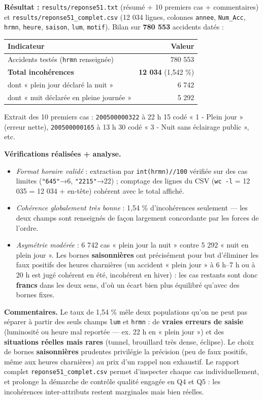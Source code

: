 \documentclass[11pt,a4paper]{article}
\newcommand{\rub}[2]{\textbf{\textcolor{#1}{#2}}}
\begin{document}
\rub{labresultat}{Résultat :} \texttt{results/reponse51.txt} (résumé + 10 premiers cas + commentaires) et \texttt{results/reponse51\_complet.csv} (12 034 lignes, colonnes \texttt{annee}, \texttt{Num\_Acc}, \texttt{hrmn}, \texttt{heure}, \texttt{saison}, \texttt{lum}, \texttt{motif}). Bilan sur \textbf{780 553} accidents datés :

\begin{center}
\begin{tabular}{l r}
\hline
\textbf{Indicateur} & \textbf{Valeur} \\
\hline
Accidents testés (\texttt{hrmn} renseignée) & 780 553 \\
\textbf{Total incohérences} & \textbf{12 034} (1,542 \%) \\
dont « plein jour déclaré la nuit » & 6 742 \\
dont « nuit déclarée en pleine journée » & 5 292 \\
\hline
\end{tabular}
\end{center}

Extrait des 10 premiers cas : \texttt{200500000322} à 22 h 15 codé « 1 - Plein jour » (erreur nette), \texttt{200500000165} à 13 h 30 codé « 3 - Nuit sans éclairage public », etc.

\rub{labanalyse}{Vérifications réalisées + analyse.}

\begin{itemize}
\item \emph{Format horaire validé} : extraction par \texttt{int(hrmn)//100} vérifiée sur des cas limites (\texttt{"645"}→6, \texttt{"2215"}→22) ; comptage des lignes du CSV (\texttt{wc -l} = 12 035 = 12 034 + en-tête) cohérent avec le total affiché.
\item \emph{Cohérence globalement très bonne} : 1,54 \% d'incohérences seulement — les deux champs sont renseignés de façon largement concordante par les forces de l'ordre.
\item \emph{Asymétrie modérée} : 6 742 cas « plein jour la nuit » contre 5 292 « nuit en plein jour ». Les bornes \textbf{saisonnières} ont précisément pour but d'éliminer les faux positifs des heures charnières (un accident « plein jour » à 6 h–7 h ou à 20 h est jugé cohérent en été, incohérent en hiver) : les cas restants sont donc \textbf{francs} dans les deux sens, d'où un écart bien plus équilibré qu'avec des bornes fixes.
\end{itemize}

\rub{labcomment}{Commentaires.} Le taux de 1,54 \% mêle deux populations qu'on ne peut pas séparer à partir des seuls champs \texttt{lum} et \texttt{hrmn} : de \textbf{vraies erreurs de saisie} (luminosité ou heure mal reportée — ex. 22 h en « plein jour ») et des \textbf{situations réelles mais rares} (tunnel, brouillard très dense, éclipse). Le choix de bornes \textbf{saisonnières} prudentes privilégie la précision (peu de faux positifs, même aux heures charnières) au prix d'un rappel non exhaustif. Le rapport complet \texttt{reponse51\_complet.csv} permet d'inspecter chaque cas individuellement, et prolonge la démarche de contrôle qualité engagée en Q4 et Q5 : les incohérences inter-attributs restent marginales mais bien réelles.
\end{document}
